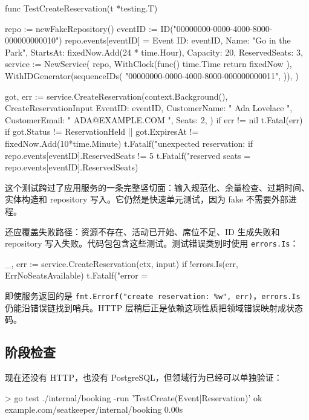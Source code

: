 \begin{gocode}[title={代码清单 12.23 \texttt{service\_test.go}：占座 happy path}]
func TestCreateReservation(t *testing.T) {
    repo := newFakeRepository()
    eventID := ID("00000000-0000-4000-8000-000000000010")
    repo.events[eventID] = Event{
        ID: eventID, Name: "Go in the Park",
        StartsAt: fixedNow.Add(24 * time.Hour),
        Capacity: 20, ReservedSeats: 3,
    }
    service := NewService(
        repo,
        WithClock(func() time.Time { return fixedNow }),
        WithIDGenerator(sequenceIDs(
            "00000000-0000-4000-8000-000000000011",
        )),
    )

    got, err := service.CreateReservation(context.Background(),
        CreateReservationInput{
            EventID: eventID, CustomerName: " Ada Lovelace ",
            CustomerEmail: " ADA@EXAMPLE.COM ", Seats: 2,
        })
    if err != nil {
        t.Fatal(err)
    }
    if got.Status != ReservationHeld ||
        got.ExpiresAt != fixedNow.Add(10*time.Minute) {
        t.Fatalf("unexpected reservation: %
    }
    if repo.events[eventID].ReservedSeats != 5 {
        t.Fatalf("reserved seats = %
            repo.events[eventID].ReservedSeats)
    }
}
\end{gocode}

这个测试跨过了应用服务的一条完整竖切面：输入规范化、余量检查、过期时间、实体构造和 repository 写入。它仍然是快速单元测试，因为 fake 不需要外部进程。

还应覆盖失败路径：资源不存在、活动已开始、席位不足、ID 生成失败和 repository 写入失败。代码包包含这些测试。测试错误类别时使用 \texttt{errors.Is}：

\begin{gocode}[]
_, err := service.CreateReservation(ctx, input)
if !errors.Is(err, ErrNoSeatsAvailable) {
    t.Fatalf("error = %
}
\end{gocode}

即使服务返回的是 \texttt{fmt.Errorf("create reservation: \%w", err)}，\texttt{errors.Is} 仍能沿错误链找到哨兵。HTTP 层稍后正是依赖这项性质把领域错误映射成状态码。

\subsection{阶段检查}

现在还没有 HTTP，也没有 PostgreSQL，但领域行为已经可以单独验证：

\begin{shellcode}[title={运行服务层测试}]
> go test ./internal/booking -run 'TestCreate(Event|Reservation)'
ok      example.com/seatkeeper/internal/booking   0.00s
\end{shellcode}
\color{PocketInk}

